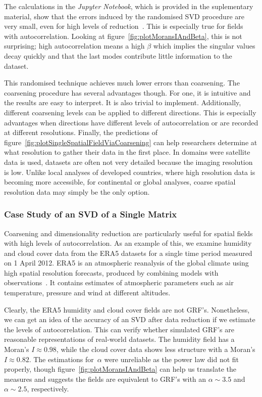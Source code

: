 \documentclass[ijgi,article,submit,moreauthors,pdftex,10pt,a4paper]{Definitions/mdpi}
\begin{document}
The calculations in the \textit{Jupyter Notebook}, which is provided in the suplementary material, show that the errors induced by the randomised SVD procedure are very small, even for high levels of reduction~\cite{Bogaardt2018}. This is especially true for fields with autocorrelation. Looking at figure~\ref{fig:plotMoransIAndBeta}, this is not surprising; high autocorrelation means a high $\beta$ which implies the singular values decay quickly and that the last modes contribute little information to the dataset.

This randomised technique achieves much lower errors than coarsening. The coarsening procedure has several advantages though. For one, it is intuitive and the results are easy to interpret. It is also trivial to implement. Additionally, different coarsening levels can be applied to different directions. This is especially advantages when directions have different levels of autocorrelation or are recorded at different resolutions. Finally, the predictions of figure~\ref{fig:plotSingleSpatialFieldViaCoarsening} can help researchers determine at what resolution to gather their data in the first place. In domains were satellite data is used, datasets are often not very detailed because the imaging resolution is low. Unlike local analyses of developed countries, where high resolution data is becoming more accessible, for continental or global analyses, coarse spatial resolution data may simply be the only option.

\subsubsection{Case Study of an SVD of a Single Matrix}
\label{sec:Results/Case Study of an SVD of a Single Matrix} %

Coarsening and dimensionality reduction are particularly useful for spatial fields with high levels of autocorrelation. As an example of this, we examine humidity and cloud cover data from the ERA5 datasets for a single time period measured on 1 April 2012. ERA5 is an atmospheric reanalysis of the global climate using high spatial resolution forecasts, produced by combining models with observations~\cite{Dee2011}. It contains estimates of atmospheric parameters such as air temperature, pressure and wind at different altitudes.

Clearly, the ERA5 humidity and cloud cover fields are not GRF's. Nonetheless, we can get an idea of the accuracy of an SVD after data reduction if we estimate the levels of autocorrelation. This can verify whether simulated GRF's are reasonable representations of real-world datasets. The humidity field has a Moran's $I \approx 0.98$, while the cloud cover data shows less structure with a Moran's $I \approx 0.82$. The estimations for~$\alpha$ were unreliable as the power law did not fit properly, though figure~\ref{fig:plotMoransIAndBeta} can help us translate the measures and suggests the fields are equivalent to GRF's with an $\alpha \sim 3.5$ and $\alpha \sim 2.5$, respectively.
\end{document}
